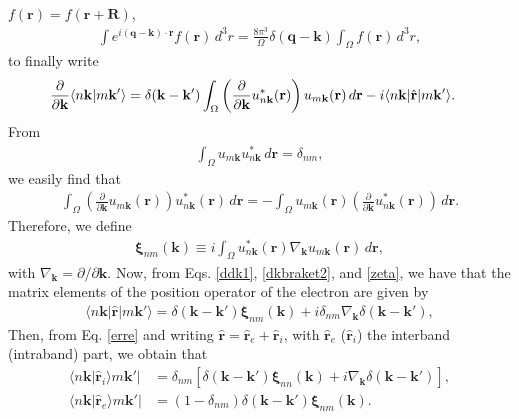 \documentclass[aps,letterpaper]{revtex4}
\begin{document}
$f(\mathbf{r}) = f(\mathbf{r} + \mathbf{R})$,
\begin{align}\label{periodic}
\int e^{i(\mathbf{q}-\mathbf{k})\cdot\mathbf{r}}f(\mathbf{r})\,d^{3}r =
\frac{8\pi^{3}}{\Omega}\delta(\mathbf{q} - \mathbf{k})
\int_{\Omega}f(\mathbf{r})\,d^{3}r,
\end{align}
to finally write \cite{blountSSP62}
\begin{align}\label{dkbraket3}
\frac{\partial}{\partial\mathbf{k}}
\langle n\mathbf{k}\vert m\mathbf{k}'\rangle
&= \delta(\mathbf{k}-\mathbf{k}')\int_{\Omega}
\left(
\frac{\partial}{\partial\mathbf{k}} u^{*}_{n\mathbf{k}}(\mathbf{r})
\right)
u_{m\mathbf{k}}(\mathbf{r})\,d\mathbf{r}
-i\langle n\mathbf{k} |\hat{\mathbf{r}}| m\mathbf{k}' \rangle.
\end{align}
From
\begin{align}\label{dnm1}
\int_{\Omega}u_{m\mathbf{k}} u^{*}_{n\mathbf{k}}\,d\mathbf{r} = \delta_{nm},
\end{align}
we easily find that
\begin{align}\label{dnm2}
\int_{\Omega}
\left(
\frac{\partial}{\partial\mathbf{k}} u_{m\mathbf{k}}(\mathbf{r})
\right)
u^{*}_{n\mathbf{k}}(\mathbf{r})\,d\mathbf{r}
= -\int_{\Omega}u_{m\mathbf{k}}(\mathbf{r})
\left(
\frac{\partial}{\partial\mathbf{k}} u^{*}_{n\mathbf{k}}(\mathbf{r})
\right)\,d\mathbf{r}.
\end{align}
Therefore, we define
\begin{align}\label{zeta}
\boldsymbol{\xi}_{nm}(\mathbf{k}) \equiv
i\int_{\Omega}u^{*}_{n\mathbf{k}}(\mathbf{r})\nabla_{\mathbf{k}}
u_{m\mathbf{k}}(\mathbf{r})\,d\mathbf{r},
\end{align} 
with $\nabla_{\mathbf{k}} = \partial/\partial\mathbf{k}$. Now, from Eqs.
\eqref{ddk1}, \eqref{dkbraket2}, and  \eqref{zeta}, we have that the matrix
elements of the position operator of the electron are given by
\begin{align}\label{erre}
\langle n\mathbf{k}\vert \hat{\mathbf{r}} \vert m\mathbf{k}'\rangle 
= \delta(\mathbf{k}-\mathbf{k}')\boldsymbol{\xi}_{nm}(\mathbf{k})
+ i\delta_{nm}\nabla_{\mathbf{k}}\delta(\mathbf{k}-\mathbf{k}'),
\end{align}
Then, from Eq. \eqref{erre} and writing $\hat{\mathbf{r}} = \hat{\mathbf{r}}_{e}
+ \hat{\mathbf{r}}_{i}$, with $\hat{\mathbf{r}}_{e}$ ($\hat{\mathbf{r}}_{i}$)
the interband (intraband) part, we obtain that
\begin{align}\label{rnmi}
\langle n\mathbf{k}\vert \hat{\mathbf{r}}_{i} \rangle m\mathbf{k}'\vert
&= \delta_{nm}
\left[
  \delta(\mathbf{k}-\mathbf{k}')\boldsymbol{\xi}_{nn}(\mathbf{k})
+ i\nabla_{\mathbf{k}}\delta(\mathbf{k} - \mathbf{k}')
\right],\\
\langle n\mathbf{k}\vert \hat{\mathbf{r}}_e \rangle m\mathbf{k}'\vert
&= (1 - \delta_{nm})\delta(\mathbf{k}-\mathbf{k}')
   \boldsymbol{\xi}_{nm}(\mathbf{k}).
\label{rnme}
\end{align} 
\end{document}
